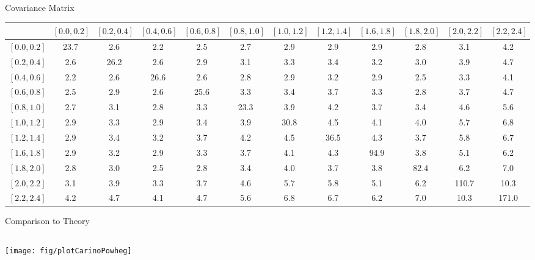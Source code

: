 \documentclass[t, 8pt]{beamer}
\begin{document}
\begin{frame}{Covariance Matrix}
  \tiny{
  \begin{center}
    \begin{tabular}{l|ccccccccccc}
& \scriptsize{$\left[0.0,0.2\right]$}
& \scriptsize{$\left[0.2,0.4\right]$}
& \scriptsize{$\left[0.4,0.6\right]$} 
& \scriptsize{$\left[0.6,0.8\right]$}   
& \scriptsize{$\left[0.8,1.0\right]$}
& \scriptsize{$\left[1.0,1.2\right]$} 
& \scriptsize{$\left[1.2,1.4\right]$}
& \scriptsize{$\left[1.6,1.8\right]$}
& \scriptsize{$\left[1.8,2.0\right]$} 
& \scriptsize{$\left[2.0,2.2\right]$} 
& \scriptsize{$\left[2.2,2.4\right]$} \\ \hline
\scriptsize{$\left[0.0,0.2\right]$} & 23.7 & 2.6 & 2.2 & 2.5 & 2.7 & 2.9 & 2.9 & 2.9 & 2.8 & 3.1 & 4.2 \\
\scriptsize{$\left[0.2,0.4\right]$} & 2.6 & 26.2 & 2.6 & 2.9 & 3.1 & 3.3 & 3.4 & 3.2 & 3.0 & 3.9 & 4.7 \\
\scriptsize{$\left[0.4,0.6\right]$} & 2.2 & 2.6 & 26.6 & 2.6 & 2.8 & 2.9 & 3.2 & 2.9 & 2.5 & 3.3 & 4.1 \\
\scriptsize{$\left[0.6,0.8\right]$} & 2.5 & 2.9 & 2.6 & 25.6 & 3.3 & 3.4 & 3.7 & 3.3 & 2.8 & 3.7 & 4.7 \\
\scriptsize{$\left[0.8,1.0\right]$} & 2.7 & 3.1 & 2.8 & 3.3 & 23.3 & 3.9 & 4.2 & 3.7 & 3.4 & 4.6 & 5.6 \\
\scriptsize{$\left[1.0,1.2\right]$} & 2.9 & 3.3 & 2.9 & 3.4 & 3.9 & 30.8 & 4.5 & 4.1 & 4.0 & 5.7 & 6.8 \\
\scriptsize{$\left[1.2,1.4\right]$} & 2.9 & 3.4 & 3.2 & 3.7 & 4.2 & 4.5 & 36.5 & 4.3 & 3.7 & 5.8 & 6.7 \\
\scriptsize{$\left[1.6,1.8\right]$} & 2.9 & 3.2 & 2.9 & 3.3 & 3.7 & 4.1 & 4.3 & 94.9 & 3.8 & 5.1 & 6.2 \\
\scriptsize{$\left[1.8,2.0\right]$} & 2.8 & 3.0 & 2.5 & 2.8 & 3.4 & 4.0 & 3.7 & 3.8 & 82.4 & 6.2 & 7.0 \\ 
\scriptsize{$\left[2.0,2.2\right]$} & 3.1 & 3.9 & 3.3 & 3.7 & 4.6 & 5.7 & 5.8 & 5.1 & 6.2 & 110.7 & 10.3 \\
\scriptsize{$\left[2.2,2.4\right]$} & 4.2 & 4.7 & 4.1 & 4.7 & 5.6 & 6.8 & 6.7 & 6.2 & 7.0 & 10.3 & 171.0 \\
    \end{tabular}
  \end{center}
  }
\end{frame}

\begin{frame}{Comparison to Theory}
  \begin{columns}[c]
    \texttt{[image: fig/plotCarinoPowheg]}
  \end{columns}
\end{frame}
\end{document}
